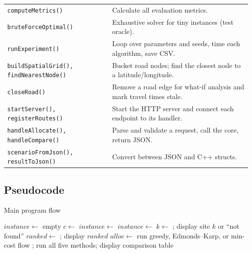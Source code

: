 \documentclass[11pt]{article}
\begin{document}
{\begin{xltabular}{\textwidth}{@{}>{\raggedright\arraybackslash}p{0.38\textwidth} X@{}}
\texttt{computeMetrics()} & Calculate all evaluation metrics.\\
\texttt{bruteForceOptimal()} & Exhaustive solver for tiny instances (test oracle).\\
\texttt{runExperiment()} & Loop over parameters and seeds, time each algorithm, save CSV.\\
\texttt{buildSpatialGrid(), findNearestNode()} & Bucket road nodes; find the closest node to a latitude/longitude.\\
\texttt{closeRoad()} & Remove a road edge for what-if analysis and mark travel times stale.\\
\texttt{startServer(), registerRoutes()} & Start the HTTP server and connect each endpoint to its handler.\\
\texttt{handleAllocate(), handleCompare()} & Parse and validate a request, call the core, return JSON.\\
\texttt{scenarioFromJson(), resultToJson()} & Convert between JSON and C++ structs.\\
\bottomrule
\end{xltabular}}

\subsection{Pseudocode}

\begin{algorithm}[H]
\caption{Main program flow}
\begin{algorithmic}[1]
\State $instance \gets$ empty
\Repeat
  \State {}
  \State $c \gets$ 
   \State $instance \gets$ 
   \State $instance \gets$ 
   \State $k \gets$ ; display site $k$ or ``not found''
   \State $ranked \gets$ ; display $ranked$
     \State $alloc \gets$ run greedy, Edmonds--Karp, or min-cost flow
     \State {}; 
   \State run all five methods; display comparison table
   \State {}
  \EndIf
{}
\State {}
\end{algorithmic}
\end{algorithm}
\end{document}
